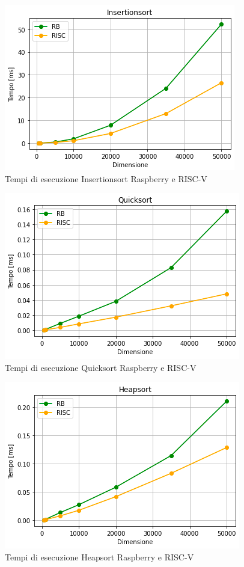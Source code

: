 \documentclass[12pt, a4paper]{report}
\begin{document}
\begin{figure}[ht]
\centering
	\includegraphics[scale=0.8]{Insertionsort_RB_RISC.PNG}
	\caption{Tempi di esecuzione Insertionsort Raspberry e RISC-V}
	\label{GrafInsertion}
\end{figure}
\begin{figure}[ht]
\centering
	\includegraphics[scale=0.8]{Quicksort_RB_RISC.PNG}
	\caption{Tempi di esecuzione Quicksort Raspberry e RISC-V}
	\label{GrafQuick}
\end{figure}
\begin{figure}[ht]
\centering
	\includegraphics[scale=0.8]{Heapsort_RB_RISC.PNG}
	\caption{Tempi di esecuzione Heapsort Raspberry e RISC-V}
	\label{GrafHeap}
\end{figure}
\end{document}
